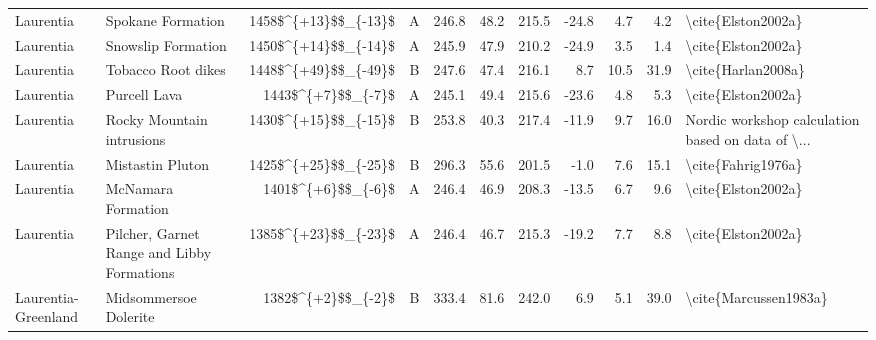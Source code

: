 \begin{longtable}{p{1 in}p{1 in}rrrrrrrr}
                     Laurentia &                                Spokane Formation &   1458\$\textasciicircum \{+13\}\$\$\_\{-13\}\$ &      A &     246.8 &      48.2 & 215.5 & -24.8 &       4.7 &         4.2 &                                 \textbackslash cite\{Elston2002a\} \\
                     Laurentia &                               Snowslip Formation &   1450\$\textasciicircum \{+14\}\$\$\_\{-14\}\$ &      A &     245.9 &      47.9 & 210.2 & -24.9 &       3.5 &         1.4 &                                 \textbackslash cite\{Elston2002a\} \\
                     Laurentia &                               Tobacco Root dikes &   1448\$\textasciicircum \{+49\}\$\$\_\{-49\}\$ &      B &     247.6 &      47.4 & 216.1 &   8.7 &      10.5 &        31.9 &                                 \textbackslash cite\{Harlan2008a\} \\
                     Laurentia &                                     Purcell Lava &     1443\$\textasciicircum \{+7\}\$\$\_\{-7\}\$ &      A &     245.1 &      49.4 & 215.6 & -23.6 &       4.8 &         5.3 &                                 \textbackslash cite\{Elston2002a\} \\
                     Laurentia &                        Rocky Mountain intrusions &   1430\$\textasciicircum \{+15\}\$\$\_\{-15\}\$ &      B &     253.8 &      40.3 & 217.4 & -11.9 &       9.7 &        16.0 &  Nordic workshop calculation based on data of \textbackslash ... \\
                     Laurentia &                                 Mistastin Pluton &   1425\$\textasciicircum \{+25\}\$\$\_\{-25\}\$ &      B &     296.3 &      55.6 & 201.5 &  -1.0 &       7.6 &        15.1 &                                 \textbackslash cite\{Fahrig1976a\} \\
                     Laurentia &                               McNamara Formation &     1401\$\textasciicircum \{+6\}\$\$\_\{-6\}\$ &      A &     246.4 &      46.9 & 208.3 & -13.5 &       6.7 &         9.6 &                                 \textbackslash cite\{Elston2002a\} \\
                     Laurentia &       Pilcher, Garnet Range and Libby Formations &   1385\$\textasciicircum \{+23\}\$\$\_\{-23\}\$ &      A &     246.4 &      46.7 & 215.3 & -19.2 &       7.7 &         8.8 &                                 \textbackslash cite\{Elston2002a\} \\
           Laurentia-Greenland &                            Midsommersoe Dolerite &     1382\$\textasciicircum \{+2\}\$\$\_\{-2\}\$ &      B &     333.4 &      81.6 & 242.0 &   6.9 &       5.1 &        39.0 &                              \textbackslash cite\{Marcussen1983a\} \\

\end{longtable}
